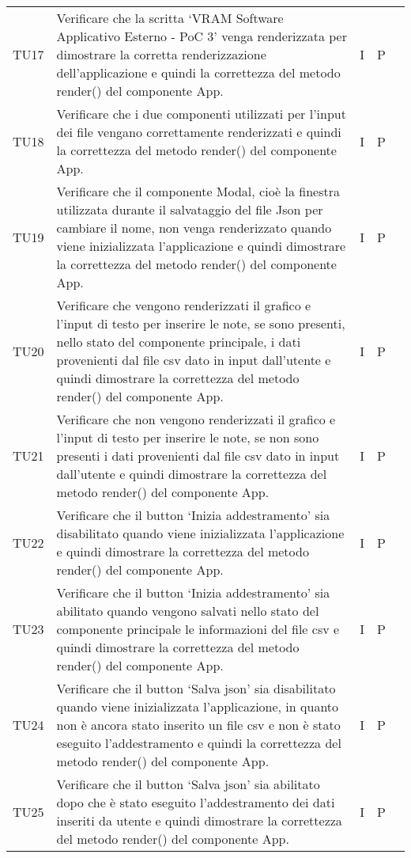 \begin{longtable} {
		>{}p{15mm} 
		>{}p{79.5mm}
		>{}p{15mm} 
		>{}p{15mm}
		>{}p{0mm}}
	TU17	& Verificare che la scritta ‘VRAM Software Applicativo Esterno - PoC 3’ venga renderizzata per dimostrare la corretta renderizzazione dell’applicazione e quindi la correttezza del metodo render() del componente App. & I & P &\TBstrut \\ [2mm]
	TU18	& Verificare che i due componenti utilizzati per l’input dei file vengano correttamente renderizzati e quindi la correttezza del metodo render() del componente App. & I & P &\TBstrut \\ [2mm]
	TU19	& Verificare che il componente Modal, cioè la finestra utilizzata durante il salvataggio del file Json per cambiare il nome, non venga renderizzato quando viene inizializzata l’applicazione e quindi dimostrare la correttezza del metodo render() del componente App. & I & P &\TBstrut \\ [2mm]
	TU20	& Verificare che vengono renderizzati il grafico e l’input di testo per inserire le note, se sono presenti, nello stato del componente principale, i dati provenienti dal file csv dato in input dall’utente e quindi dimostrare la correttezza del metodo render() del componente App. & I & P &\TBstrut \\ [2mm]
	TU21	& Verificare che non vengono renderizzati il grafico e l’input di testo per inserire le note, se non sono presenti i dati provenienti dal file csv dato in input dall’utente e quindi dimostrare la correttezza del metodo render() del componente App. & I & P &\TBstrut \\ [2mm]
	TU22	& Verificare che il button ‘Inizia addestramento’ sia disabilitato quando viene inizializzata l’applicazione e quindi dimostrare la correttezza del metodo render() del componente App. & I & P &\TBstrut \\ [2mm]
	TU23	& Verificare che il button ‘Inizia addestramento’ sia abilitato quando vengono salvati nello stato del componente principale le informazioni del file csv e quindi dimostrare la correttezza del metodo render() del componente App. & I & P &\TBstrut \\ [2mm]
	TU24	& Verificare che il button ‘Salva json’ sia disabilitato quando viene inizializzata l’applicazione, in quanto non è ancora stato inserito un file csv e non è stato eseguito l’addestramento e quindi la correttezza del metodo render() del componente App. & I & P &\TBstrut \\ [2mm]
	TU25	& Verificare che il button ‘Salva json’ sia abilitato dopo che è stato eseguito l’addestramento dei dati inseriti da utente e quindi dimostrare la correttezza del metodo render() del componente App. & I & P &\TBstrut \\ [2mm]

\end{longtable}
